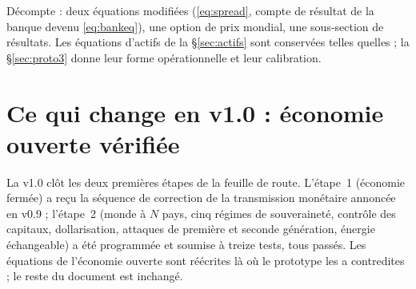 \documentclass[11pt,a4paper]{article}
\begin{document}
Décompte : deux équations modifiées (\eqref{eq:spread}, compte de résultat de la banque devenu \eqref{eq:bankeq}), une option de prix mondial, une sous-section de résultats. Les équations d'actifs de la \S\ref{sec:actifs} sont conservées telles quelles ; la \S\ref{sec:proto3} donne leur forme opérationnelle et leur calibration.

\section*{Ce qui change en v1.0 : économie ouverte vérifiée}
La v1.0 clôt les deux premières étapes de la feuille de route. L'étape~1 (économie fermée) a reçu la séquence de correction de la transmission monétaire annoncée en v0.9 ; l'étape~2 (monde à $N$ pays, cinq régimes de souveraineté, contrôle des capitaux, dollarisation, attaques de première et seconde génération, énergie échangeable) a été programmée et soumise à treize tests, tous passés. Les équations de l'économie ouverte sont réécrites là où le prototype les a contredites ; le reste du document est inchangé.
\end{document}
